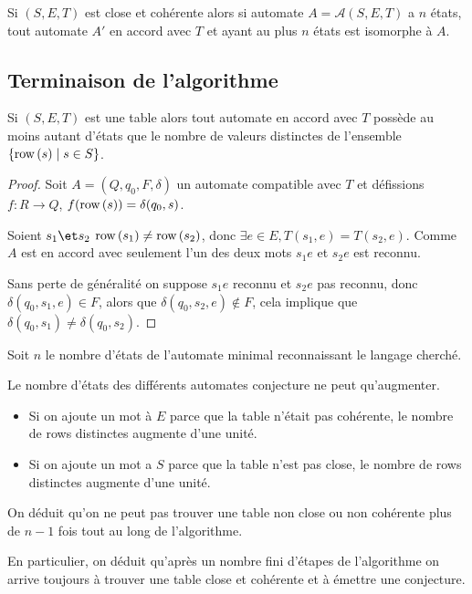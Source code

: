 \begin{lemma}
	Si $(S,E,T)$ est close et cohérente alors si automate $A = \mathcal A (S,E,T)$
	a $n$ états, tout automate $A'$ en accord avec $T$ et ayant au plus $n$ états est isomorphe à $A$.
\end{lemma}

\subsection{Terminaison de l'algorithme}

\begin{lemma}
	Si $(S,E,T)$ est une table alors tout automate en accord avec $T$ possède au
	moins autant d'états que le nombre de valeurs distinctes de l'ensemble $\left\{\text{row}\left(s\right) \mid s \in S\right\}$.
\end{lemma}

\begin{proof}
	Soit $A = (Q,q_0,F,\delta)$ un automate compatible avec $T$ et défissions
	$f: R \to Q$, $f(\text{row}\left(s\right)) = \delta(q_0, s)$.

	Soient $s_1 \et s_2$ \tq $\text{row}\left(s_1\right) \neq \text{row}\left(s_2\right)$, donc $\exists e \in E, T(s_1,e) = T(s_2,e)$.
	Comme $A$ est en accord avec seulement l'un des deux mots $s_1e$ et $s_2e$ est reconnu.

	Sans perte de généralité on suppose $s_1e$ reconnu et $s_2e$ pas reconnu, donc
	$\delta (q_0, s_1, e) \in F$, alors que $\delta (q_0,s_2,e) \notin F$, cela implique que
	$\delta (q_0,s_1) \neq \delta (q_0,s_2)$.

\end{proof}

Soit $n$ le nombre d'états de l'automate minimal reconnaissant le langage cherché.

\begin{remarque}
	Le nombre d'états des différents automates conjecture ne peut qu'augmenter.
	\begin{itemize}
		\item Si on ajoute un mot à $E$ parce que la table n'était pas cohérente, le nombre de rows distinctes augmente
		      d'une unité.
		\item Si on ajoute un mot a $S$ parce que la table n'est pas close, le nombre de rows distinctes augmente d'une unité.
	\end{itemize}
	On déduit qu'on ne peut pas trouver une table non close ou non cohérente plus de $n-1$ fois tout au long de l'algorithme.

	En particulier, on déduit qu'après un nombre fini d'étapes de l'algorithme on arrive toujours à trouver
	une table close et cohérente et à émettre une conjecture.
\end{remarque}


